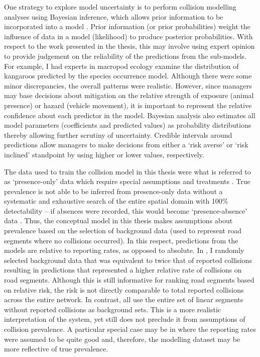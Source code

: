 One strategy to explore model uncertainty is to perform collision modelling analyses using Bayesian inference, which allows prior information to be incorporated into a model \citep{mcca07}. Prior information (or prior probabilities) weight the influence of data in a model (likelihood) to produce posterior probabilities. With respect to the work presented in the thesis, this may involve using expert opinion to provide judgement on the reliability of the predictions from the sub-models. For example, I had experts in macropod ecology examine the distribution of kangaroos predicted by the species occurrence model. Although there were some minor discrepancies, the overall patterns were realistic. However, since managers may base decisions about mitigation on the relative strength of exposure (animal presence) or hazard (vehicle movement), it is important to represent the relative confidence about each predictor in the model. Bayesian analysis also estimates all model parameters (coefficients and predicted values) as probability distributions thereby allowing further scrutiny of uncertainty. Credible intervals around predictions allow managers to make decisions from either a `risk averse' or `risk inclined' standpoint by using higher or lower values, respectively. 

The data used to train the collision model in this thesis were what is referred to as `presence-only' data which require special assumptions and treatments \citep{wart13}. True prevalence is not able to be inferred from presence-only data without a systematic and exhaustive search of the entire spatial domain with 100\% detectability -- if absences were recorded, this would become `presence-absence' data \citep[see][]{hast13}. Thus, the conceptual model in this thesis makes assumptions about prevalence based on the selection of background data (used to represent road segments where no collisions occurred). In this respect, predictions from the models are relative to reporting rates, as opposed to absolute.  In , I randomly selected background data that was equivalent to twice that of reported collisions resulting in predictions that represented a higher relative rate of collisions on road segments. Although this is still informative for ranking road segments based on relative risk, the risk is not directly comparable to total reported collisions across the entire network. In contrast,  all use the entire set of linear segments without reported collisions as background sets. This is a more realistic interpretation of the system, yet still does not preclude it from assumptions of collision prevalence. A particular special case may be in  where the reporting rates were assumed to be quite good and, therefore, the modelling dataset may be more reflective of true prevalence.

